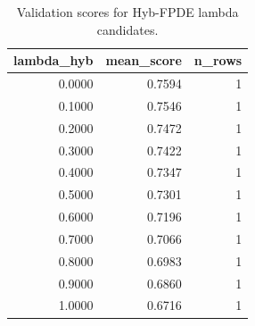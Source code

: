 \begin{table}[t]
\caption{Validation scores for Hyb-FPDE lambda candidates.}
\label{tab:lambda_distribution_computed}
\centering
\begin{tabular}{rrr}
\toprule
lambda\_hyb & mean\_score & n\_rows \\
\midrule
0.0000 & 0.7594 & 1 \\
0.1000 & 0.7546 & 1 \\
0.2000 & 0.7472 & 1 \\
0.3000 & 0.7422 & 1 \\
0.4000 & 0.7347 & 1 \\
0.5000 & 0.7301 & 1 \\
0.6000 & 0.7196 & 1 \\
0.7000 & 0.7066 & 1 \\
0.8000 & 0.6983 & 1 \\
0.9000 & 0.6860 & 1 \\
1.0000 & 0.6716 & 1 \\
\bottomrule
\end{tabular}

\end{table}
